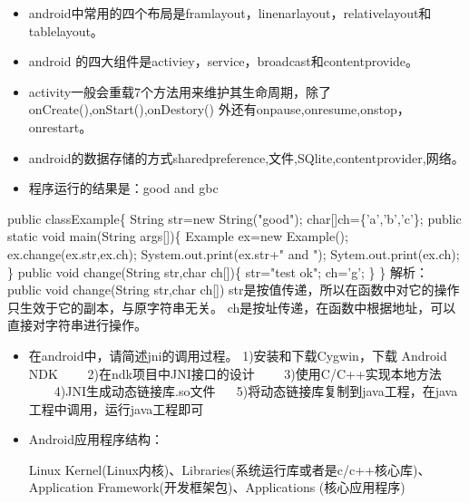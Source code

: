 \documentclass[9pt, b5paper]{article}
\begin{document}
\begin{itemize}
\item android中常用的四个布局是framlayout，linenarlayout，relativelayout和tablelayout。

\item android 的四大组件是activiey，service，broadcast和contentprovide。

\item activity一般会重载7个方法用来维护其生命周期，除了onCreate(),onStart(),onDestory() 外还有onpause,onresume,onstop，onrestart。
\item android的数据存储的方式sharedpreference,文件,SQlite,contentprovider,网络。

\item 程序运行的结果是：good and gbc
\end{itemize}
 public classExample\{
String str=new String("good");
char[]ch=\{'a','b','c'\};
public static void main(String args[])\{
Example ex=new Example();
ex.change(ex.str,ex.ch);
System.out.print(ex.str+" and ");
Sytem.out.print(ex.ch);
\}
public void change(String str,char ch[])\{
str="test ok";
ch\footnotemark[2]{}='g';
\}
\}
    解析：
    public void change(String str,char ch[])
    str是按值传递，所以在函数中对它的操作只生效于它的副本，与原字符串无关。
    ch是按址传递，在函数中根据地址，可以直接对字符串进行操作。
\begin{itemize}
\item 在android中，请简述jni的调用过程。
   1)安装和下载Cygwin，下载 Android NDK
　　2)在ndk项目中JNI接口的设计
　　3)使用C/C++实现本地方法
　　4)JNI生成动态链接库.so文件
　  5)将动态链接库复制到java工程，在java工程中调用，运行java工程即可
\item Android应用程序结构：

Linux Kernel(Linux内核)、Libraries(系统运行库或者是c/c++核心库)、Application Framework(开发框架包)、Applications (核心应用程序)
\end{itemize}
\end{document}
